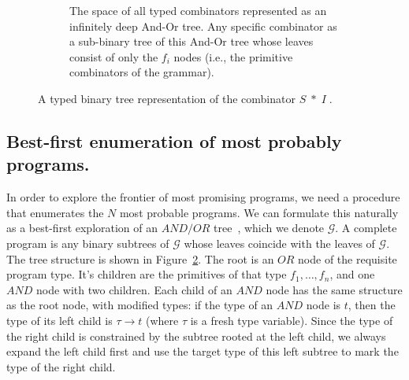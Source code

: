 \documentclass{article}
\begin{document}
\begin{figure}
\begin{subfigure}[After]{0.4\linewidth}
    \caption{The space of all typed combinators represented as an
      infinitely deep And-Or tree. Any specific combinator as a
      sub-binary tree of this And-Or tree whose leaves consist of only
      the $f_i$ nodes (i.e., the primitive combinators of the
      grammar).}
    \label{fig:andor}
    \end{subfigure}
  \caption{A typed binary tree representation of the combinator $S\;*\;I\;$.}
\end{figure}

\subsection{Best-first enumeration of most probably programs.}
In order to explore the frontier of most promising programs, we need a
procedure that enumerates the $N$ most probable programs. We can
formulate this naturally as a best-first exploration of an $AND/OR$
tree~\cite{nilsson1982principles}, which we denote $\mathcal{G}$. A
complete program is any binary subtrees of $\mathcal{G}$ whose leaves
coincide with the leaves of $\mathcal{G}$. The tree structure is shown
in Figure~\ref{fig:andor}. The root is an $OR$ node of the requisite
program type. It's children are the primitives of that type $f_1,
\dots, f_n$, and one $AND$ node with two children. Each child of an
$AND$ node has the same structure as the root node, with modified
types: if the type of an $AND$ node is $t$, then the type of its left
child is $\tau \rightarrow t$ (where $\tau$ is a fresh type
variable). Since the type of the right child is constrained by the
subtree rooted at the left child, we always expand the left child
first and use the target type of this left subtree to mark the type of
the right child.
\end{document}
